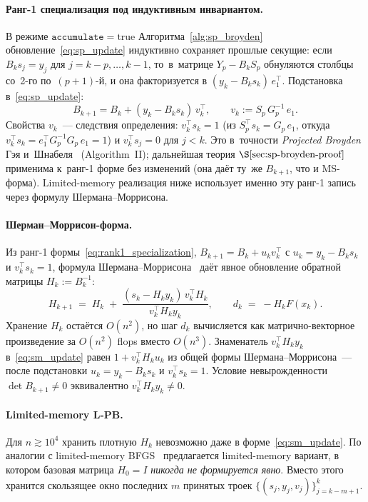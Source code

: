 \paragraph{Ранг-1 специализация под индуктивным инвариантом.}
В режиме $\mathtt{accumulate}=\text{true}$ Алгоритма~\ref{alg:sp_broyden}
обновление~\eqref{eq:sp_update} индуктивно сохраняет прошлые секущие:
если $B_k s_j = y_j$ для $j = k{-}p,\ldots,k{-}1$, то~в~матрице
$Y_p - B_k S_p$ обнуляются столбцы со~2-го по~$(p{+}1)$-й, и она
факторизуется в $(y_k - B_k s_k)\,e_1^\top$. Подстановка в~\eqref{eq:sp_update}:
\begin{equation}\label{eq:rank1_specialization}
  B_{k+1} = B_k + (y_k - B_k s_k)\,v_k^\top,
  \qquad
  v_k := S_p\,G_p^{-1}\,e_1.
\end{equation}
Свойства $v_k$~--- следствия определения: $v_k^\top s_k = 1$ (из
$S_p^\top s_k = G_p\,e_1$, откуда $v_k^\top s_k = e_1^\top G_p^{-1} G_p\,e_1 = 1$)
и $v_k^\top s_j = 0$ для $j<k$. Это в~точности \emph{Projected Broyden}
Гэя и~Шнабеля~\cite{gay_schnabel1978} (Algorithm~II); дальнейшая теория
$\S\ref{sec:sp-broyden-proof}$ применима к~ранг-1 форме без изменений
(она даёт ту~же $B_{k+1}$, что и MS-форма). Limited-memory реализация
ниже использует именно эту ранг-1 запись через формулу Шермана--Моррисона.

\paragraph{Шерман--Моррисон-форма.}
Из ранг-1 формы~\eqref{eq:rank1_specialization}, $B_{k+1} = B_k + u_k v_k^\top$
с $u_k = y_k - B_k s_k$ и $v_k^\top s_k = 1$,
формула Шермана--Моррисона~\cite[\S 3.4]{dennis1996} даёт явное
обновление обратной матрицы $H_k := B_k^{-1}$:
\begin{equation}\label{eq:sm_update}
   H_{k+1} \;=\; H_k \;+\; \frac{(s_k - H_k y_k)\,v_k^{\top} H_k}
                                 {v_k^{\top} H_k y_k},
   \qquad
   d_k \;=\; -H_k F(x_k).
\end{equation}
Хранение $H_k$ остаётся $O(n^2)$, но шаг $d_k$ вычисляется как
матрично-векторное произведение за $O(n^2)$ flops вместо $O(n^3)$.
Знаменатель $v_k^{\top} H_k y_k$ в~\eqref{eq:sm_update} равен
$1 + v_k^{\top} H_k u_k$ из общей формы
Шермана--Моррисона~--- после подстановки $u_k = y_k - B_k s_k$ и
$v_k^{\top} s_k = 1$. Условие невырожденности $\det B_{k+1} \ne 0$
эквивалентно $v_k^{\top} H_k y_k \ne 0$.

\paragraph{Limited-memory L-PB.} Для $n\gtrsim 10^4$ хранить
плотную $H_k$ невозможно даже в форме~\eqref{eq:sm_update}. По аналогии
с limited-memory BFGS~\cite{lbfgs,liu1989} предлагается limited-memory
вариант, в котором базовая матрица $H_0=I$ \emph{никогда не
формируется явно}. Вместо этого хранится скользящее окно последних
$m$ принятых троек $\{(s_j, y_j, v_j)\}_{j=k-m+1}^{k}$.

